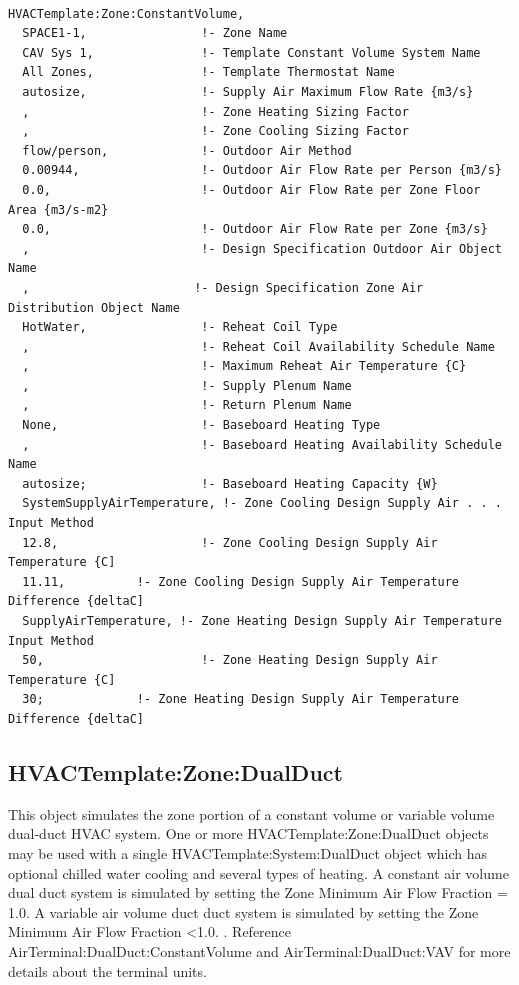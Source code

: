 \begin{lstlisting}

HVACTemplate:Zone:ConstantVolume,
  SPACE1-1,                !- Zone Name
  CAV Sys 1,               !- Template Constant Volume System Name
  All Zones,               !- Template Thermostat Name
  autosize,                !- Supply Air Maximum Flow Rate {m3/s}
  ,                        !- Zone Heating Sizing Factor
  ,                        !- Zone Cooling Sizing Factor
  flow/person,             !- Outdoor Air Method
  0.00944,                 !- Outdoor Air Flow Rate per Person {m3/s}
  0.0,                     !- Outdoor Air Flow Rate per Zone Floor Area {m3/s-m2}
  0.0,                     !- Outdoor Air Flow Rate per Zone {m3/s}
  ,                        !- Design Specification Outdoor Air Object Name
  ,                       !- Design Specification Zone Air Distribution Object Name
  HotWater,                !- Reheat Coil Type
  ,                        !- Reheat Coil Availability Schedule Name
  ,                        !- Maximum Reheat Air Temperature {C}
  ,                        !- Supply Plenum Name
  ,                        !- Return Plenum Name
  None,                    !- Baseboard Heating Type
  ,                        !- Baseboard Heating Availability Schedule Name
  autosize;                !- Baseboard Heating Capacity {W}
  SystemSupplyAirTemperature, !- Zone Cooling Design Supply Air . . . Input Method
  12.8,                    !- Zone Cooling Design Supply Air Temperature {C]
  11.11,          !- Zone Cooling Design Supply Air Temperature Difference {deltaC]
  SupplyAirTemperature, !- Zone Heating Design Supply Air Temperature Input Method
  50,                      !- Zone Heating Design Supply Air Temperature {C]
  30;             !- Zone Heating Design Supply Air Temperature Difference {deltaC]
\end{lstlisting}

\subsection{HVACTemplate:Zone:DualDuct}\label{hvactemplatezonedualduct}

This object simulates the zone portion of a constant volume or variable volume dual-duct HVAC system. One or more HVACTemplate:Zone:DualDuct objects may be used with a single HVACTemplate:System:DualDuct object which has optional chilled water cooling and several types of heating. A constant air volume dual duct system is simulated by setting the Zone Minimum Air Flow Fraction = 1.0. A variable air volume duct duct system is simulated by setting the Zone Minimum Air Flow Fraction \textless{}1.0. . Reference AirTerminal:DualDuct:ConstantVolume and AirTerminal:DualDuct:VAV for more details about the terminal units.

